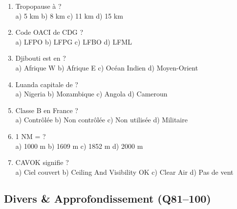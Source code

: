 \begin{enumerate}[nosep, start=61]
\item Tropopause à ? \\ a) 5 km \quad b) 8 km \quad c) 11 km \quad d) 15 km

\item Code OACI de CDG ? \\ a) LFPO \quad b) LFPG \quad c) LFBO \quad d) LFML

\item Djibouti est en ? \\ a) Afrique W \quad b) Afrique E \quad c) Océan Indien \quad d) Moyen-Orient

\item Luanda capitale de ? \\ a) Nigeria \quad b) Mozambique \quad c) Angola \quad d) Cameroun

\item Classe B en France ? \\ a) Contrôlée \quad b) Non contrôlée \quad c) Non utilisée \quad d) Militaire

\item 1 NM = ? \\ a) 1000 m \quad b) 1609 m \quad c) 1852 m \quad d) 2000 m

\item CAVOK signifie ? \\ a) Ciel couvert \quad b) Ceiling And Visibility OK \quad c) Clear Air \quad d) Pas de vent
\end{enumerate}

\subsection*{Divers \& Approfondissement (Q81--100)}

